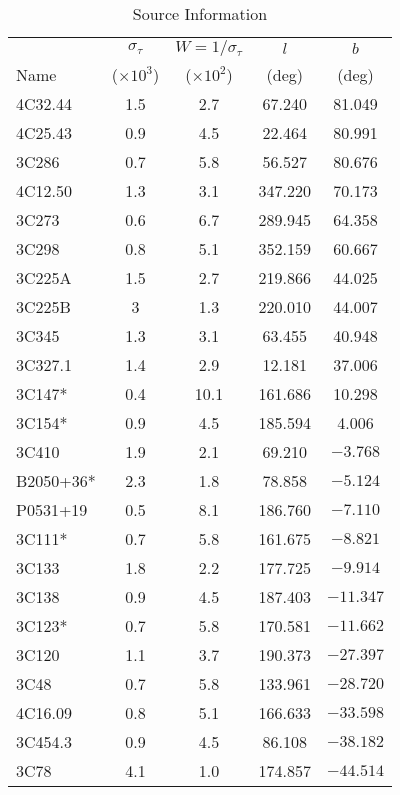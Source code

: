 \documentclass{aastex}
\begin{document}
\begin{table*}
\centering
\caption{Source Information}
\begin{tabular}{l c c c c}
\hline
\hline
\small
 & $\sigma_\tau$\tablenotemark{a} & $W=1/\sigma_\tau$\tablenotemark{b}  & $l$ & $b$ \\ 
Name & ($\times10^{3}$) & ($\times10^2$) &(deg) & (deg) \\
\hline
4C32.44 & 1.5 & 2.7 & 67.240 & 81.049 \\ 
4C25.43 & 0.9 & 4.5 & 22.464 & 80.991 \\ 
3C286 & 0.7 & 5.8 & 56.527 & 80.676 \\ 
4C12.50 & 1.3 & 3.1 & 347.220 & 70.173 \\ 
3C273 & 0.6 & 6.7 & 289.945 & 64.358 \\ 
3C298 & 0.8 & 5.1 & 352.159 & 60.667 \\ 
3C225A & 1.5 & 2.7 & 219.866 & 44.025 \\ 
3C225B & 3 & 1.3 & 220.010 & 44.007 \\ 
3C345 & 1.3 & 3.1 & 63.455 & 40.948 \\ 
3C327.1 & 1.4 & 2.9 & 12.181 & 37.006 \\ 
3C147* & 0.4 & 10.1 & 161.686 & 10.298 \\ 
3C154* & 0.9 & 4.5 & 185.594 & 4.006 \\ 
3C410 & 1.9 & 2.1 & 69.210 & $-3.768$ \\ 
B2050+36* & 2.3 & 1.8 & 78.858 & $-5.124$ \\ 
P0531+19 & 0.5 & 8.1 & 186.760 & $-7.110$ \\ 
3C111* & 0.7 & 5.8 & 161.675 & $-8.821$ \\ 
3C133 & 1.8 & 2.2 & 177.725 & $-9.914$ \\ 
3C138 & 0.9 & 4.5 & 187.403 & $-11.347$ \\ 
3C123* & 0.7 & 5.8 & 170.581 & $-11.662$ \\ 
3C120 & 1.1 & 3.7 & 190.373 & $-27.397$ \\ 
3C48 & 0.7 & 5.8 & 133.961 & $-28.720$ \\ 
4C16.09 & 0.8 & 5.1 & 166.633 & $-33.598$ \\ 
3C454.3 & 0.9 & 4.5 & 86.108 & $-38.182$ \\ 
3C78 & 4.1 & 1.0 & 174.857 & $-44.514$ \\ 
\hline
\end{tabular}
\end{table*}
\end{document}
